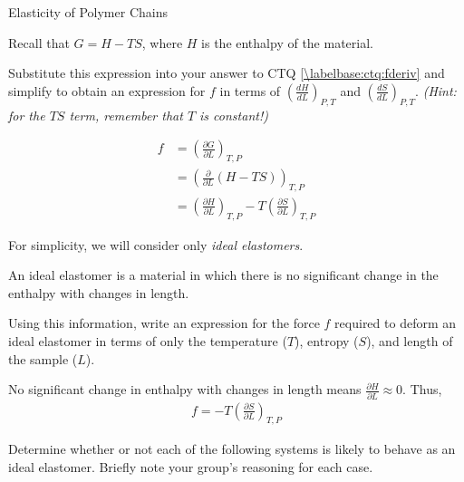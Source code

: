 \begin{activity}{Elasticity of Polymer Chains}
\begin{ctqs}
	\question Recall that $G = H - TS$, where $H$ is the enthalpy of the material.  
	
		Substitute this expression into your answer to CTQ \ref{\labelbase:ctq:fderiv} and simplify to obtain an expression for $f$ in terms of $\left(\frac{dH}{dL}\right)_{P,T}$ and $\left(\frac{dS}{dL}\right)_{P,T}$.  \emph{(Hint: for the $TS$ term, remember that $T$ is constant!)}
		
		\begin{solution}[1.25in]{}
			\begin{align*}
				f &= \left(\frac{\partial G}{\partial L}\right)_{T,P}\\
					&= \left(\frac{\partial}{\partial L}(H-TS)\right)_{T,P}\\
					&= \left(\frac{\partial H}{\partial L}\right)_{T,P} - T\left(\frac{\partial S}{\partial L}\right)_{T,P}
			\end{align*}
		\end{solution}
		
		\label{\labelbase:ctq:fdSdL}
	
\end{ctqs}

\begin{infobox}
	
	For simplicity, we will consider only \emph{ideal elastomers}.
	
	An ideal elastomer is a material in which there is no significant change in the enthalpy with changes in length.
	
\end{infobox}

\begin{ctqs}

	\question Using this information, write an expression for the force $f$ required to deform an ideal elastomer in terms of only the temperature ($T$), entropy ($S$), and length of the sample ($L$).
		
		\begin{solution}[1in]{}
			No significant change in enthalpy with changes in length means $\frac{\partial H}{\partial L} \approx 0$.  Thus,
			\begin{align*}
				f = - T\left(\frac{\partial S}{\partial L}\right)_{T,P}
			\end{align*}
		\end{solution}
	
	\question Determine whether or not each of the following systems is likely to behave as an ideal elastomer.  Briefly note your group's reasoning for each case.
	

\end{ctqs}
\end{activity}
